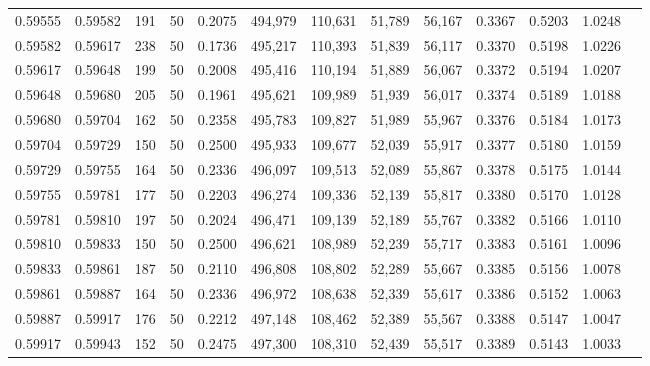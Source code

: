 \begin{tabular}{rrrrrrrrrrrrr}
0.59555 & 0.59582 &   191 &  50 &                                     0.2075 & 494,979 & 110,631 &  51,789 &  56,167 & 0.3367 & 0.5203 & 1.0248 \\
0.59582 & 0.59617 &   238 &  50 &                                     0.1736 & 495,217 & 110,393 &  51,839 &  56,117 & 0.3370 & 0.5198 & 1.0226 \\
0.59617 & 0.59648 &   199 &  50 &                                     0.2008 & 495,416 & 110,194 &  51,889 &  56,067 & 0.3372 & 0.5194 & 1.0207 \\
0.59648 & 0.59680 &   205 &  50 &                                     0.1961 & 495,621 & 109,989 &  51,939 &  56,017 & 0.3374 & 0.5189 & 1.0188 \\
0.59680 & 0.59704 &   162 &  50 &                                     0.2358 & 495,783 & 109,827 &  51,989 &  55,967 & 0.3376 & 0.5184 & 1.0173 \\
0.59704 & 0.59729 &   150 &  50 &                                     0.2500 & 495,933 & 109,677 &  52,039 &  55,917 & 0.3377 & 0.5180 & 1.0159 \\
0.59729 & 0.59755 &   164 &  50 &                                     0.2336 & 496,097 & 109,513 &  52,089 &  55,867 & 0.3378 & 0.5175 & 1.0144 \\
0.59755 & 0.59781 &   177 &  50 &                                     0.2203 & 496,274 & 109,336 &  52,139 &  55,817 & 0.3380 & 0.5170 & 1.0128 \\
0.59781 & 0.59810 &   197 &  50 &                                     0.2024 & 496,471 & 109,139 &  52,189 &  55,767 & 0.3382 & 0.5166 & 1.0110 \\
0.59810 & 0.59833 &   150 &  50 &                                     0.2500 & 496,621 & 108,989 &  52,239 &  55,717 & 0.3383 & 0.5161 & 1.0096 \\
0.59833 & 0.59861 &   187 &  50 &                                     0.2110 & 496,808 & 108,802 &  52,289 &  55,667 & 0.3385 & 0.5156 & 1.0078 \\
0.59861 & 0.59887 &   164 &  50 &                                     0.2336 & 496,972 & 108,638 &  52,339 &  55,617 & 0.3386 & 0.5152 & 1.0063 \\
0.59887 & 0.59917 &   176 &  50 &                                     0.2212 & 497,148 & 108,462 &  52,389 &  55,567 & 0.3388 & 0.5147 & 1.0047 \\
0.59917 & 0.59943 &   152 &  50 &                                     0.2475 & 497,300 & 108,310 &  52,439 &  55,517 & 0.3389 & 0.5143 & 1.0033 \\

\end{tabular}
